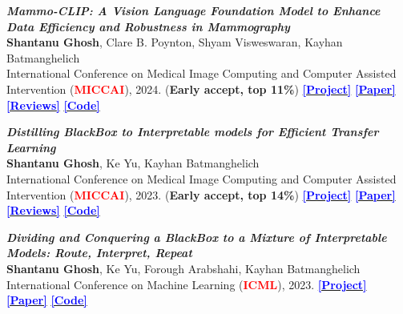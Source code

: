 {\begin{enumerate}[label=\texttt{[C\arabic*]}, start=9]
        \addtocounter{enumi}{-2}
        
        \item \textit{\textbf{Mammo-CLIP: A Vision Language Foundation Model to Enhance Data Efficiency and Robustness in Mammography}} 
        \\ \textbf{Shantanu Ghosh}, Clare B. Poynton, Shyam Visweswaran, Kayhan Batmanghelich
        \\ International Conference on Medical Image Computing and Computer Assisted Intervention 
        (\textcolor{red}{\textbf{MICCAI}}), 2024. (\textbf{Early accept, top 11\%})
        \href{https://shantanu-ai.github.io/projects/MICCAI-2024-Mammo-CLIP/}
        {\textbf{\textcolor{blue}{[Project]}}}
        \href{https://link.springer.com/chapter/10.1007/978-3-031-72390-2_59}
        {\textbf{\textcolor{blue}{[Paper]}}}
        \href{https://papers.miccai.org/miccai-2024/488-Paper0926.html}
        {\textbf{\textcolor{blue}{[Reviews]}}}
        \href{https://github.com/batmanlab/Mammo-CLIP}
        {\textbf{\textcolor{blue}{[Code]}}}

        \addtocounter{enumi}{-2}
        \item \textit{\textbf{Distilling BlackBox to Interpretable models for Efficient Transfer Learning}} 
        \\ \textbf{Shantanu Ghosh}, Ke Yu, Kayhan Batmanghelich
        \\ International Conference on Medical Image Computing and Computer Assisted Intervention 
        (\textcolor{red}{\textbf{MICCAI}}), 2023. (\textbf{Early accept, top 14\%})
        \href{https://shantanu-ai.github.io/projects/MICCAI-2023-MoIE-CXR/}
        {\textbf{\textcolor{blue}{[Project]}}}
        \href{https://link.springer.com/chapter/10.1007/978-3-031-43895-0_59}
        {\textbf{\textcolor{blue}{[Paper]}}}
        \href{https://conferences.miccai.org/2023/papers/212-Paper2523.html}
        {\textbf{\textcolor{blue}{[Reviews]}}}
        \href{https://github.com/batmanlab/MICCAI-2023-Route-interpret-repeat-CXRs}
        {\textbf{\textcolor{blue}{[Code]}}}

        \addtocounter{enumi}{-2}
        \item \textit{\textbf{Dividing and Conquering a BlackBox to a Mixture of Interpretable Models: Route, Interpret, Repeat}} 
        \\ \textbf{Shantanu Ghosh}, Ke Yu, Forough Arabshahi, Kayhan Batmanghelich
        \\ International Conference on Machine Learning 
        (\textcolor{red}{\textbf{ICML}}), 2023. 
        \href{https://shantanu-ai.github.io/projects/ICML-2023-MoIE/}
        {\textbf{\textcolor{blue}{[Project]}}}
        \href{https://openreview.net/forum?id=0SgBUsL4W0}
        {\textbf{\textcolor{blue}{[Paper]}}}
        \href{https://github.com/batmanlab/ICML-2023-Route-interpret-repeat}
        {\textbf{\textcolor{blue}{[Code]}}}


\end{enumerate}}
